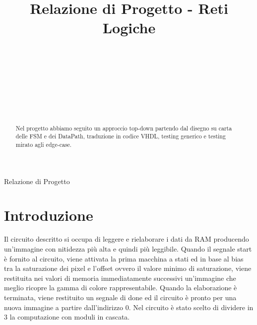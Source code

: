 \documentclass{article}
\begin{document}
\title{Relazione di Progetto - Reti Logiche%
%
}

\author{\\[2pt] 
\\
\\
\and
\\
\\
\\
}

%
%
{Relazione di Progetto} 

\maketitle

\begin{abstract}
Nel progetto abbiamo seguito un approccio top-down partendo dal disegno su carta delle FSM e dei DataPath, traduzione in codice VHDL, testing generico e testing mirato agli edge-case.
\end{abstract}


\section{Introduzione}
\label{intro}
Il circuito descritto si occupa di leggere e rielaborare i dati da RAM producendo un'immagine con nitidezza più alta e quindi più leggibile. 
Quando il segnale start è fornito al circuito, viene attivata la prima macchina a stati ed in base al bias tra la saturazione dei pixel e l'offset ovvero il valore minimo di saturazione, viene restituita nei valori di memoria immediatamente successivi un'immagine che meglio ricopre la gamma di colore rappresentabile.
Quando la elaborazione è terminata, viene restituito un segnale di done ed il circuito è pronto per una nuova immagine a partire dall'indirizzo 0.
Nel circuito è stato scelto di dividere in 3 la computazione con moduli in cascata.
\end{document}

